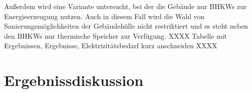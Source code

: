 Außerdem wird eine Variante untersucht, bei der die Gebäude nur BHKWs zur Energieerzeugung nutzen.
Auch in diesem Fall wird die Wahl von Sanierungsmöglichkeiten der Gebäudehülle nicht restriktiert und es steht neben den BHKWs nur thermische Speicher zur Verfügung.
XXXX Tabelle mit Ergebnissen, Ergebnisse, Elektrizitätsbedarf kurz anschneiden XXXX
















\section{Ergebnissdiskussion}
\label{sec:Sektion 62}
